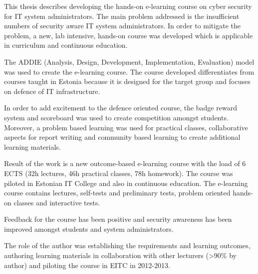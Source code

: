This thesis describes developing the hands-on e-learning course on cyber security for IT system administrators. The main problem addressed is the insufficient numbers of security aware IT system administrators. In order to mitigate the problem, a new, lab intensive, hands-on course was developed which is applicable in curriculum and continuous education.

The \gls{ADDIE} (Analysis, Design, Development, Implementation, Evaluation) model was used to create the e-learning course. The course developed differentiates from courses taught in Estonia because it is designed for the target group and focuses on defence of IT infrastructure.

In order to add excitement to the defence oriented course, the badge reward system and scoreboard was used to create competition amongst students. Moreover, a problem based learning was used for practical classes, collaborative aspects for report writing and community based learning to create additional learning materials.

Result of the work is a new outcome-based e-learning course with the load of 6 \gls{ECTS} (32h lectures, 46h practical classes, 78h homework). The course was piloted in Estonian IT College and also in continuous education. The e-learning course contains lectures, self-tests and preliminary tests, problem oriented hands-on classes and interactive tests. 

Feedback for the course has been positive and security awareness has been improved amongst students and system administrators. %

The role of the author was establishing the requirements and learning outcomes, authoring learning materials in collaboration with other lecturers (>90\% by author) and piloting the course in \gls{EITC} in 2012-2013.
